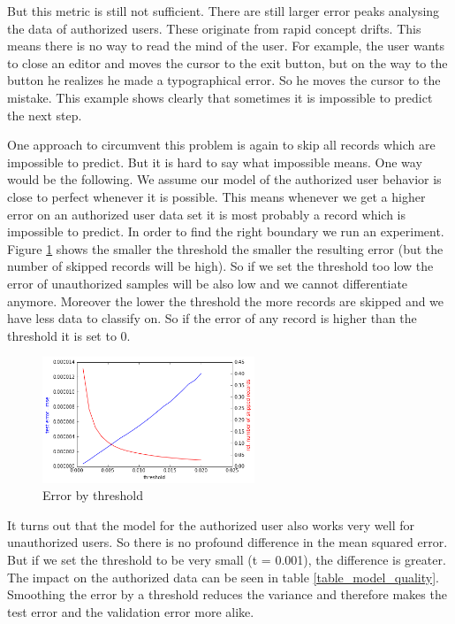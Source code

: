 \documentclass[conference]{IEEEtran}
\begin{document}
But this metric is still not sufficient. There are still larger error peaks analysing the data of authorized users. These originate from rapid concept drifts. This means there is no way to read the mind of the user. For example, the user wants to close an editor and moves the cursor to the exit button, but on the way to the button he realizes he made a typographical error. So he moves the cursor to the mistake. This example shows clearly that sometimes it is impossible to predict the next step.

One approach to circumvent this problem is again to skip all records which are impossible to predict. But it is hard to say what impossible means. One way would be the following. We assume our model of the authorized user behavior is close to perfect whenever it is possible. This means whenever we get a higher error on an authorized user data set it is most probably a record which is impossible to predict. In order to find the right boundary we run an experiment. Figure \ref{fig_threshold} shows the smaller the threshold the smaller the resulting error (but the number of skipped records will be high). So if we set the threshold too low the error of unauthorized samples will be also low and we cannot differentiate anymore. Moreover the lower the threshold the more records are skipped and we have less data to classify on. So if the error of any record is higher than the threshold it is set to 0.

\begin{figure}[!t]
\centering
\includegraphics[width=2.5in]{img/error_impossible_threshold.png}
\caption{Error by threshold}
\label{fig_threshold}
\end{figure}

It turns out that the model for the authorized user also works very well for unauthorized users. So there is no profound difference in the mean squared error. But if we set the threshold to be very small (t = 0.001), the difference is greater. The impact on the authorized data can be seen in table \ref{table_model_quality}. Smoothing the error by a threshold reduces the variance and therefore makes the test error and the validation error more alike.
\end{document}
